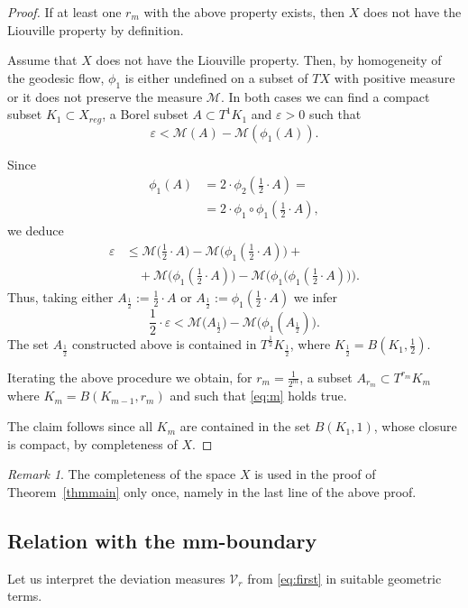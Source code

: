 \documentclass[12pt,leqno,intlimits]{amsart}
\numberwithin{equation}{section}
\theoremstyle{definition}
\theoremstyle{remark}
\newtheorem{rem}[thm]{Remark}
\newcommand{\tref}[1]{Theorem~\ref{#1}}
\begin{document}
\begin{proof}
If at least one $r_m$ with the above property exists, then $X$ does not have the Liouville property by definition.


Assume that $X$ does not have the Liouville property.
Then, by homogeneity of the geodesic flow, $\phi _1$ is either undefined  on a subset of $TX$ with positive measure
or it does not preserve the measure $\mathcal M$.
In both cases we can find a compact subset $K_1\subset X_{reg}$, a Borel subset $A\subset T^1 K_1$  and $\varepsilon >0$ such that
\[\varepsilon < \mathcal M (A) - \mathcal M(\phi_1 (A)).\]

Since
\begin{align*}
\phi_1 (A)&=2\cdot \phi _2 (\tfrac 1 2 \cdot A )=
\\
&=2\cdot \phi _1 \circ \phi_1 (\tfrac 1 2\cdot  A ) ,
\end{align*}
we deduce
\begin{align*}
\varepsilon &\leq \mathcal M \big(\tfrac 1 2\cdot A \big) - \mathcal M \big( \phi_1 (\tfrac 1 2\cdot A ) \big) +
\\
&\quad+\mathcal M \big(\phi_1 (\tfrac 1 2\cdot A )\big)
- \mathcal M\big (\phi_1 \big (\phi _1 (\tfrac 1 2\cdot A )\big) \big).
\end{align*}
Thus, taking either $A_{\frac 1 2} := \frac 1 2 \cdot A$ or $A_{\frac 1 2} := \phi_1 (\frac 1 2 \cdot A)$ we infer
$$ \frac 1 2\cdot  \varepsilon   < \mathcal M \big(A _{\frac 1 2} \big) - \mathcal M \big( \phi_1 (A _{\frac 1 2}) \big).$$
The set $A_{\frac 1 2}$ constructed above is contained in $T^{\frac 1 2} K_{\frac 1 2}$, where $K _{\frac 1 2} =B (K_1,{\frac 1 2})$.

Iterating the above procedure we obtain, for $r_m =\frac 1 {2^m}$, a subset $A_{r_m} \subset T^{r_m} K_m$ where $K_m =B (K_{m-1},{r_m})$ and such that \eqref{eq:m} holds true.

The claim follows since all $K_m$ are contained in the set $B (K_1,1)$, whose closure is compact, by completeness of $X$.
\end{proof}

\begin{rem}
The completeness of the space $X$ is used in the proof of \tref{thmmain} only once, namely in the last line of the above proof.
\end{rem}

\subsection{Relation with the mm-boundary} Let us interpret the deviation measures $\mathcal{V}_r$ from \eqref{eq:first} in suitable geometric terms.
\end{document}
